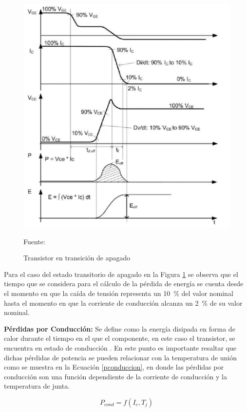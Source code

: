 \begin{figure}[H]
\centering
\includegraphics[scale=0.65]{Figuras/off.png}
\caption{Transistor en transición de apagado}
Fuente: \cite{beltran}
\label{apagado}
\end{figure}

Para el caso del estado transitorio de apagado en la Figura \ref{apagado} se observa que el tiempo que se considera para el cálculo de la pérdida de energía se cuenta desde el momento en que la caída de tensión representa un \SI{10}{\percent} del valor nominal hasta el momento en que la corriente de conducción alcanza un \SI{2}{\percent} de su valor nominal.

\textbf{Pérdidas por Conducción:} Se define como la energía disipada en forma de calor durante el tiempo en el que el componente, en este caso el transistor, se encuentra en estado de conducción \cite{beltran}. En este punto es importante resaltar que dichas pérdidas de potencia se pueden relacionar con la temperatura de unión como se muestra en la Ecuación \ref{pconduccion}, en donde las pérdidas por conducción son una función dependiente de la corriente de conducción y la temperatura de junta.

\begin{equation}\label{pconduccion}
    P_{cond} = f(I_{c},T_{j})  
\end{equation}

